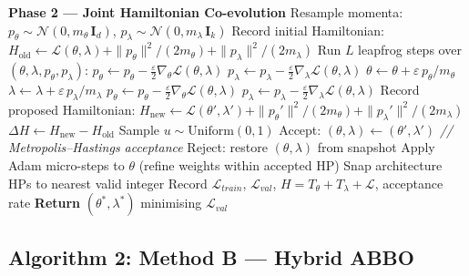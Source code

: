 \documentclass[12pt,a4paper]{article}
\begin{document}
\begin{algorithm}[tb]
\begin{algorithmic}[1]
\State \textbf{Phase 2 — Joint Hamiltonian Co-evolution}
  \State Resample momenta:
         $p_\theta \sim \mathcal{N}(0, m_\theta\,\mathbf{I}_d)$,
         $p_\lambda \sim \mathcal{N}(0, m_\lambda\,\mathbf{I}_k)$
  \State Record initial Hamiltonian:
         $H_{\mathrm{old}} \leftarrow \mathcal{L}(\theta,\lambda)
            + \|p_\theta\|^2/(2m_\theta)
            + \|p_\lambda\|^2/(2m_\lambda)$
  \State Run $L$ leapfrog steps over $(\theta, \lambda, p_\theta, p_\lambda)$:
    \State $p_\theta \leftarrow p_\theta
              - \tfrac{\varepsilon}{2}\nabla_\theta\mathcal{L}(\theta,\lambda)$
           \quad [Eq.\,\eqref{eq:lf1}]
    \State $p_\lambda \leftarrow p_\lambda
              - \tfrac{\varepsilon}{2}\nabla_\lambda\mathcal{L}(\theta,\lambda)$
    \State $\theta \leftarrow \theta + \varepsilon\,p_\theta/m_\theta$
           \quad [Eq.\,\eqref{eq:lf2}]
    \State $\lambda \leftarrow \lambda + \varepsilon\,p_\lambda/m_\lambda$
    \State $p_\theta \leftarrow p_\theta
              - \tfrac{\varepsilon}{2}\nabla_\theta\mathcal{L}(\theta,\lambda)$
           \quad [Eq.\,\eqref{eq:lf3}]
    \State $p_\lambda \leftarrow p_\lambda
              - \tfrac{\varepsilon}{2}\nabla_\lambda\mathcal{L}(\theta,\lambda)$
  \EndFor
  \State Record proposed Hamiltonian:
         $H_{\mathrm{new}} \leftarrow \mathcal{L}(\theta',\lambda')
            + \|p_\theta'\|^2/(2m_\theta)
            + \|p_\lambda'\|^2/(2m_\lambda)$
  \State $\Delta H \leftarrow H_{\mathrm{new}} - H_{\mathrm{old}}$
  \State Sample $u \sim \mathrm{Uniform}(0, 1)$
    \State Accept: $(\theta, \lambda) \leftarrow (\theta', \lambda')$
         \hfill \textit{// Metropolis--Hastings acceptance}
  \Else
    \State Reject: restore $(\theta, \lambda)$ from snapshot
  \EndIf
  \State Apply Adam micro-steps to $\theta$ (refine weights within accepted HP)
  \State Snap architecture HPs to nearest valid integer
  \State Record $\mathcal{L}_{train}$, $\mathcal{L}_{val}$,
         $H = T_\theta + T_\lambda + \mathcal{L}$, acceptance rate
\EndFor
\State \textbf{Return} $(\theta^*, \lambda^*)$ minimising $\mathcal{L}_{val}$
\end{algorithmic}
\end{algorithm}

\subsection{Algorithm 2: Method B — Hybrid ABBO}
\end{document}
